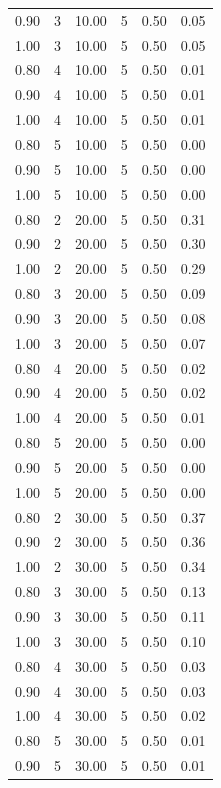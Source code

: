 \documentclass[12pt]{article}
\begin{document}
{\begin{longtable}{cccccc}
  0.90 &   3 & 10.00 &   5 & 0.50 & 0.05 \\ 
  1.00 &   3 & 10.00 &   5 & 0.50 & 0.05 \\ 
  0.80 &   4 & 10.00 &   5 & 0.50 & 0.01 \\ 
  0.90 &   4 & 10.00 &   5 & 0.50 & 0.01 \\ 
  1.00 &   4 & 10.00 &   5 & 0.50 & 0.01 \\ 
  0.80 &   5 & 10.00 &   5 & 0.50 & 0.00 \\ 
  0.90 &   5 & 10.00 &   5 & 0.50 & 0.00 \\ 
  1.00 &   5 & 10.00 &   5 & 0.50 & 0.00 \\ 
  0.80 &   2 & 20.00 &   5 & 0.50 & 0.31 \\ 
  0.90 &   2 & 20.00 &   5 & 0.50 & 0.30 \\ 
  1.00 &   2 & 20.00 &   5 & 0.50 & 0.29 \\ 
  0.80 &   3 & 20.00 &   5 & 0.50 & 0.09 \\ 
  0.90 &   3 & 20.00 &   5 & 0.50 & 0.08 \\ 
  1.00 &   3 & 20.00 &   5 & 0.50 & 0.07 \\ 
  0.80 &   4 & 20.00 &   5 & 0.50 & 0.02 \\ 
  0.90 &   4 & 20.00 &   5 & 0.50 & 0.02 \\ 
  1.00 &   4 & 20.00 &   5 & 0.50 & 0.01 \\ 
  0.80 &   5 & 20.00 &   5 & 0.50 & 0.00 \\ 
  0.90 &   5 & 20.00 &   5 & 0.50 & 0.00 \\ 
  1.00 &   5 & 20.00 &   5 & 0.50 & 0.00 \\ 
  0.80 &   2 & 30.00 &   5 & 0.50 & 0.37 \\ 
  0.90 &   2 & 30.00 &   5 & 0.50 & 0.36 \\ 
  1.00 &   2 & 30.00 &   5 & 0.50 & 0.34 \\ 
  0.80 &   3 & 30.00 &   5 & 0.50 & 0.13 \\ 
  0.90 &   3 & 30.00 &   5 & 0.50 & 0.11 \\ 
  1.00 &   3 & 30.00 &   5 & 0.50 & 0.10 \\ 
  0.80 &   4 & 30.00 &   5 & 0.50 & 0.03 \\ 
  0.90 &   4 & 30.00 &   5 & 0.50 & 0.03 \\ 
  1.00 &   4 & 30.00 &   5 & 0.50 & 0.02 \\ 
  0.80 &   5 & 30.00 &   5 & 0.50 & 0.01 \\ 
  0.90 &   5 & 30.00 &   5 & 0.50 & 0.01 \\ 

\end{longtable}}
\end{document}
